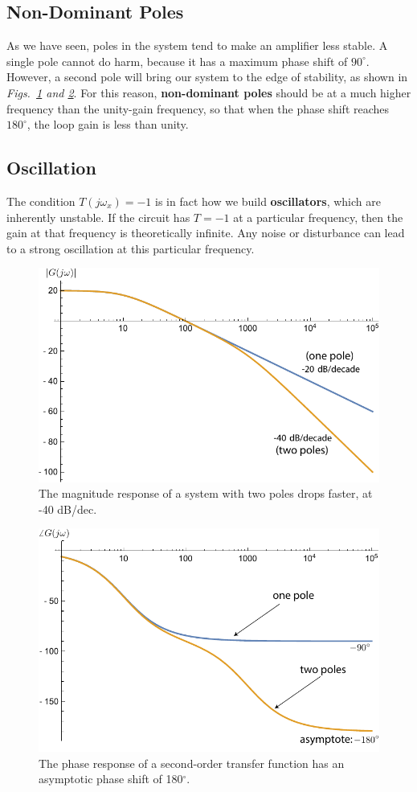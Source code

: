 \subsection{Non-Dominant Poles}
As we have seen, poles in the system tend to make an amplifier less stable. A single pole cannot do harm, because it has a maximum phase shift of $90^\circ$.  However, a second pole will bring our system to the edge of stability, as shown in \emph{Figs.~\ref{fig:mag2pole} and \ref{fig:phase2pole}}.  For this reason, \textbf{non-dominant poles} should be at a much higher frequency than the unity-gain frequency, so that when the phase shift reaches $180^\circ$, the loop gain is less than unity.
\subsection{Oscillation}
The condition $T(j\omega_x) = -1$ is in fact how we build \textbf{oscillators}, which are inherently unstable. If the circuit has $T = -1$ at a particular frequency, then the gain at that frequency is theoretically infinite.  Any noise or disturbance can lead to a strong oscillation at this particular frequency.
\newpage
\begin{figure}[t]
\centering
\includegraphics[width=.55\columnwidth]{mag2pole}
\caption{The magnitude response of a system with two poles drops faster, at -40 dB/dec.} \label{fig:mag2pole}
\end{figure}
\begin{figure}[H]
\centering
\includegraphics[width=.55\columnwidth]{phase2pole}
\caption{The phase response of a second-order transfer function has an asymptotic phase shift of 180$^\circ$.} \label{fig:phase2pole}
\end{figure}

